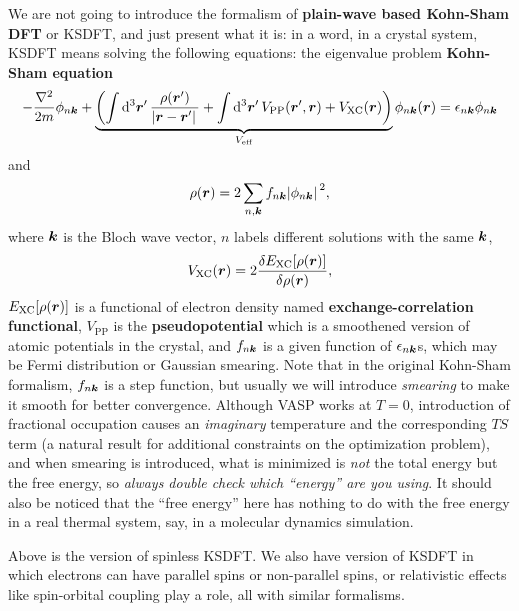 \documentclass[hyperref, a4paper]{article}
\newcommand*{\concept}[1]{{\textbf{#1}}}
\begin{document}
We are not going to introduce the formalism of \concept{plain-wave based Kohn-Sham DFT} or KSDFT, and just present what it is: in a word, in a crystal system, KSDFT means solving the following equations: the eigenvalue problem \concept{Kohn-Sham equation}
\begin{equation}
    - \frac{\laplacian}{2m} \phi_{n \vb*{k}} + \underbrace{\left( \int \dd[3]{\vb*{r}'} \frac{\rho(\vb*{r}')}{\abs*{\vb*{r} - \vb*{r}'}} + \int \dd[3]{\vb*{r}'} V_\text{PP}(\vb*{r}', \vb*{r}) + V_\text{XC}(\vb*{r}) \right)}_{V_\text{eff}} \phi_{n \vb*{k}}(\vb*{r}) = \epsilon_{n \vb*{k}} \phi_{n \vb*{k}}
\end{equation}
and
\begin{equation}
    \rho(\vb*{r}) = 2 \sum_{n, \vb*{k}} f_{n \vb*{k}} \abs*{\phi_{n \vb*{k}}}^2,
\end{equation}
where $\vb*{k}$ is the Bloch wave vector, $n$ labels different solutions with the same $\vb*{k}$,
\begin{equation}
    V_\text{XC}(\vb*{r}) = 2 \fdv{E_\text{XC}[\rho(\vb*{r})]}{\rho(\vb*{r})},
\end{equation}
$E_\text{XC}[\rho(\vb*{r})]$ is a functional of electron density named \concept{exchange-correlation functional}, 
$V_\text{PP}$ is the \concept{pseudopotential} which is a smoothened version of atomic potentials in the crystal,
and $f_{n \vb*{k}}$ is a given function of $\epsilon_{n \vb*{k}}$s, which may be Fermi distribution or Gaussian smearing.
Note that in the original Kohn-Sham formalism, $f_{n \vb*{k}}$ is a step function, but usually we will introduce \emph{smearing} to make it smooth for better convergence.
Although VASP works at $T=0$, introduction of fractional occupation causes an \emph{imaginary} temperature and the corresponding $TS$ term (a natural result for additional constraints on the optimization problem), and when smearing is introduced, what is minimized is \emph{not} the total energy but the free energy, so \emph{always double check which ``energy'' are you using}.
It should also be noticed that the ``free energy'' here has nothing to do with the free energy in a real thermal system, say, in a molecular dynamics simulation.

Above is the version of spinless KSDFT. We also have version of KSDFT in which electrons can have parallel spins or non-parallel spins, or relativistic effects like spin-orbital coupling play a role, all with similar formalisms.
\end{document}
